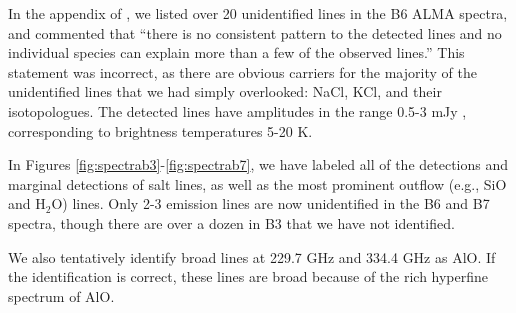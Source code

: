 \documentclass[twocolumn]{aastex62}
\begin{document}


In the appendix of \citet{Ginsburg2018b}, we listed over 20 unidentified 
lines in the B6 ALMA spectra, and commented that ``there is no
consistent pattern to the detected lines and no individual species can explain
more than a few of the observed lines.''  This statement was incorrect, as
there are obvious carriers for the majority of the unidentified lines that we
had simply overlooked: NaCl, KCl, and their isotopologues.  The
detected lines have amplitudes in the range 0.5-3 mJy \perbeam, corresponding
to brightness temperatures 5-20 K.  

In Figures \ref{fig:spectrab3}-\ref{fig:spectrab7}, we have labeled all of the
detections and marginal detections of salt lines, as well as the most prominent
outflow (e.g., SiO and H$_2$O) lines.  Only 2-3 emission lines are now
unidentified in the B6 and B7 spectra, though there are over a dozen in B3 that
we have not identified. 

We also tentatively identify broad lines at 229.7 GHz and 334.4 GHz as AlO.  If
the identification is correct, these lines are broad because of the rich hyperfine
spectrum of AlO.

%
\end{document}
